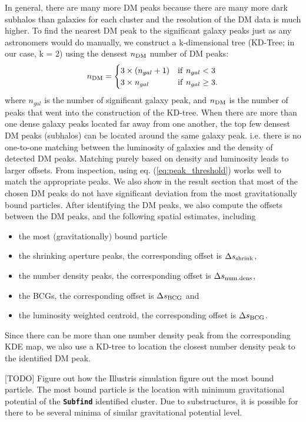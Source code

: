 In general, there are many more DM peaks because there are many more dark 
subhalos than galaxies for each cluster and the resolution of the DM data is
much higher. To find the nearest DM peak to the significant galaxy peaks just as any
astronomers would do manually,  
we construct a k-dimensional tree (KD-Tree; in our case, k = 2) 
using the densest $n_{\rm DM}$  number of DM peaks:
\begin{equation}
	n_{\rm DM} = \begin{cases}		
		3 \times (n_{gal} + 1) & {\rm if~} n_{gal} < 3 \\
	3 \times n_{gal}  & {\rm if~} n_{gal} \geq 3.
	\end{cases}
	\label{eq:peak_threshold}
\end{equation}
where $n_{gal}$ is the number of significant galaxy peak, and $n_{\rm DM}$
is the number of peaks that went into the construction of the KD-tree.
When there are more
than one dense galaxy peaks located far away from one another, 
the top few densest DM peaks (subhalos) 
can be located around the same galaxy peak.
i.e. there is no one-to-one matching between the luminosity of galaxies and the
density of detected DM peaks.
Matching purely based on density and luminosity leads to larger offsets.
From inspection, using eq. (\ref{eq:peak_threshold}) works well to match the 
appropriate peaks. We also show in the result section that most of the chosen DM peaks
do not have significant deviation from the most gravitationally bound particles.
After identifying the DM peaks, we also compute the 
offsets 
between the DM peaks, and the following spatial estimates, including 
\begin{itemize}
	\item the most (gravitationally) bound particle 
	\item the shrinking aperture peaks, the corresponding offset is $\Delta s_{\rm
		shrink}$, 
	\item the number density peaks, the corresponding offset is $\Delta s_{\rm
		num.dens}$, 
	\item the BCGs, the corresponding offset is $\Delta s_{\rm BCG}$ and
\item the luminosity weighted centroid, the corresponding offset is $\Delta s_{\rm BCG}$.
\end{itemize}
Since there can be more than one number density peak from the corresponding KDE
map, we also use a KD-tree to location the closest number density peak to the 
identified DM peak.

[TODO] Figure out how the Illustris simulation figure out the most bound 
particle.
The most bound particle is the location with minimum 
gravitational potential of the {\bf \texttt{Subfind}} identified cluster.
Due to substructures, it is possible for there to be several minima of similar 
gravitational potential level. 

